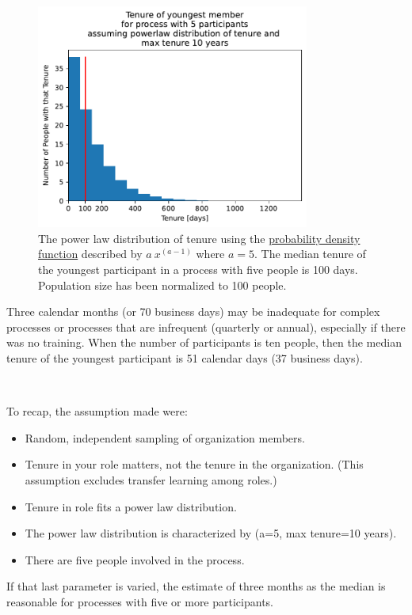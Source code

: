 \begin{figure}[!htb] %
    \centering
    \includegraphics[width=0.8\textwidth]{images/tenure_power_distribution_a5_with_max_tenure10_and_5_participants.pdf}
    \caption{The power law distribution of tenure using the \href{https://en.wikipedia.org/wiki/Probability_density_function}{probability density function}
    described by $a\ x^{(a-1)}$ where $a=5$. The median tenure of the youngest participant  in a process with five people is 100 days. Population size has been normalized to 100 people.}
    \label{fig:tenure-powerlaw-5-participants-tenure10}
\end{figure}


Three calendar months (or 70 business days) may be inadequate for complex processes or processes that are infrequent (quarterly or annual), especially if there was no training. When the number of participants is ten people, then the median tenure of the youngest participant is 51 calendar days (37 business days).

\ \\

\begin{samepage}
To recap, the assumption made were:
\begin{itemize}
    \item Random, independent sampling of organization members. 
    \item Tenure in your role matters, not the tenure in the organization. (This assumption excludes transfer learning among roles.)
    \item Tenure in role fits a power law distribution.
    \item The power law distribution is characterized by (a=5, max tenure=10 years). 
    \item There are five people involved in the process.
\end{itemize}
\end{samepage}
If that last parameter is varied, the estimate of three months as the median  is reasonable for processes with five or more participants.

